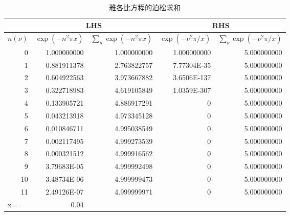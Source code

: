 \begin{table}[htbp]
\centering
\caption{雅各比方程的泊松求和}
  \begin{tabular}{|l|r|rrr}
  \toprule
        & \multicolumn{2}{c|}{LHS} & \multicolumn{2}{c|}{RHS} \\
  \midrule
  $n(\nu)$ & \multicolumn{1}{l|}{$\exp \left( -n^{2} \pi x \right)$} & \multicolumn{1}{l|}{$\sum_{n} \exp \left( -n^{2} \pi x \right)$} & \multicolumn{1}{l|}{$\exp \left( -\nu^{2} \pi / x \right)$} &
  \multicolumn{1}{l|}{$\sum_{\nu} \exp \left( -\nu^{2} \pi / x \right)$} \\
  \midrule
  \multicolumn{1}{|r|}{0} & 1.000000000 & \multicolumn{1}{r|}{1.000000000} & \multicolumn{1}{r|}{1.000000000} & \multicolumn{1}{r|}{5.000000000} \\
  \midrule
  \multicolumn{1}{|r|}{1} & 0.881911378 & \multicolumn{1}{r|}{2.763822757} & \multicolumn{1}{r|}{7.77304E-35} & \multicolumn{1}{r|}{5.000000000} \\
  \midrule
  \multicolumn{1}{|r|}{2} & 0.604922563 & \multicolumn{1}{r|}{3.973667882} & \multicolumn{1}{r|}{3.6506E-137} & \multicolumn{1}{r|}{5.000000000} \\
  \midrule
  \multicolumn{1}{|r|}{3} & 0.322718983 & \multicolumn{1}{r|}{4.619105849} & \multicolumn{1}{r|}{1.0359E-307} & \multicolumn{1}{r|}{5.000000000} \\
  \midrule
  \multicolumn{1}{|r|}{4} & 0.133905721 & \multicolumn{1}{r|}{4.886917291} & \multicolumn{1}{r|}{0} & \multicolumn{1}{r|}{5.000000000} \\
  \midrule
  \multicolumn{1}{|r|}{5} & 0.043213918 & \multicolumn{1}{r|}{4.973345128} & \multicolumn{1}{r|}{0} & \multicolumn{1}{r|}{5.000000000} \\
  \midrule
  \multicolumn{1}{|r|}{6} & 0.010846711 & \multicolumn{1}{r|}{4.995038549} & \multicolumn{1}{r|}{0} & \multicolumn{1}{r|}{5.000000000} \\
  \midrule
  \multicolumn{1}{|r|}{7} & 0.002117495 & \multicolumn{1}{r|}{4.999273539} & \multicolumn{1}{r|}{0} & \multicolumn{1}{r|}{5.000000000} \\
  \midrule
  \multicolumn{1}{|r|}{8} & 0.000321512 & \multicolumn{1}{r|}{4.999916562} & \multicolumn{1}{r|}{0} & \multicolumn{1}{r|}{5.000000000} \\
  \midrule
  \multicolumn{1}{|r|}{9} & 3.79683E-05 & \multicolumn{1}{r|}{4.999992498} & \multicolumn{1}{r|}{0} & \multicolumn{1}{r|}{5.000000000} \\
  \midrule
  \multicolumn{1}{|r|}{10} & 3.48734E-06 & \multicolumn{1}{r|}{4.999999473} & \multicolumn{1}{r|}{0} & \multicolumn{1}{r|}{5.000000000} \\
  \midrule
  \multicolumn{1}{|r|}{11} & 2.49126E-07 & \multicolumn{1}{r|}{4.999999971} & \multicolumn{1}{r|}{0} & \multicolumn{1}{r|}{5.000000000} \\
  \midrule
  x=    & 0.04  &       &       &  \\
\cmidrule{1-2}    \end{tabular}%
\label{tab:fourier-poisson-jacobian-equiv}%


\end{table}
